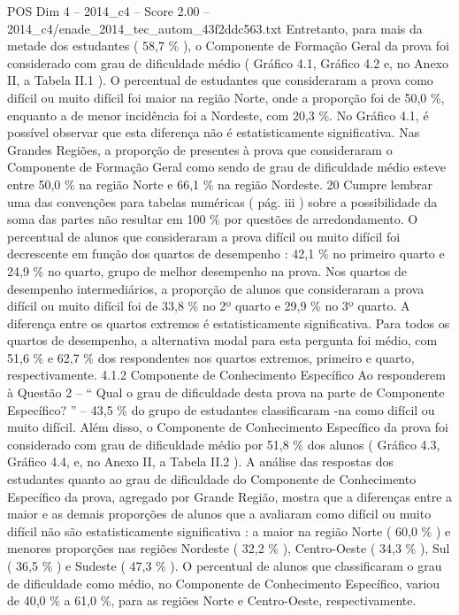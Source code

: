\begin{textsample}{POS Dim 4 – 2014\_c4 – Score 2.00 – 2014\_c4/enade\_2014\_tec\_autom\_43f2ddc563.txt}
Entretanto, para mais da metade dos estudantes ( 58,7 \% ), o Componente de Formação Geral da prova foi considerado com grau de dificuldade médio ( Gráfico 4.1, Gráfico 4.2 e, no Anexo II, a Tabela II.1 ).
O percentual de estudantes que consideraram a prova como difícil ou muito difícil foi maior na região Norte, onde a proporção foi de 50,0 \%, enquanto a de menor incidência foi a Nordeste, com 20,3 \%.
No Gráfico 4.1, é possível observar que esta diferença não é estatisticamente significativa.
Nas Grandes Regiões, a proporção de presentes à prova que consideraram o Componente de Formação Geral como sendo de grau de dificuldade médio esteve entre 50,0 \% na região Norte e 66,1 \% na região Nordeste. 20 Cumpre lembrar uma das convenções para tabelas numéricas ( pág. iii ) sobre a possibilidade da soma das partes não resultar em 100 \% por questões de arredondamento.
O percentual de alunos que consideraram a prova difícil ou muito difícil foi decrescente em função dos quartos de desempenho : 42,1 \% no primeiro quarto e 24,9 \% no quarto, grupo de melhor desempenho na prova.
Nos quartos de desempenho intermediários, a proporção de alunos que consideraram a prova difícil ou muito difícil foi de 33,8 \% no 2º quarto e 29,9 \% no 3º quarto.
A diferença entre os quartos extremos é estatisticamente significativa.
Para todos os quartos de desempenho, a alternativa modal para esta pergunta foi médio, com 51,6 \% e 62,7 \% dos respondentes nos quartos extremos, primeiro e quarto, respectivamente. 4.1.2 Componente de Conhecimento Específico Ao responderem à Questão 2 – “ Qual o grau de dificuldade desta prova na parte de Componente Específico? ” – 43,5 \% do grupo de estudantes classificaram -na como difícil ou muito difícil.
Além disso, o Componente de Conhecimento Específico da prova foi considerado com grau de dificuldade médio por 51,8 \% dos alunos ( Gráfico 4.3, Gráfico 4.4, e, no Anexo II, a Tabela II.2 ).
A análise das respostas dos estudantes quanto ao grau de dificuldade do Componente de Conhecimento Específico da prova, agregado por Grande Região, mostra que a diferenças entre a maior e as demais proporções de alunos que a avaliaram como difícil ou muito difícil não são estatisticamente significativa : a maior na região Norte ( 60,0 \% ) e menores proporções nas regiões Nordeste ( 32,2 \% ), Centro-Oeste ( 34,3 \% ), Sul ( 36,5 \% ) e Sudeste ( 47,3 \% ).
O percentual de alunos que classificaram o grau de dificuldade como médio, no Componente de Conhecimento Específico, variou de 40,0 \% a 61,0 \%, para as regiões Norte e Centro-Oeste, respectivamente.

\end{textsample}
